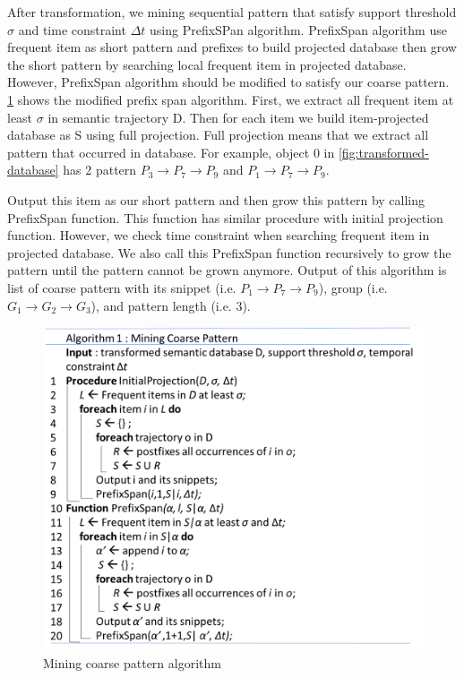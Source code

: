 \documentclass[conference]{IEEEtran}
\begin{document}
After transformation, we mining sequential pattern that satisfy support threshold $\sigma$ and time constraint $\Delta t$ using PrefixSPan algorithm. PrefixSpan algorithm use frequent item as short pattern and prefixes to build projected database then grow the short pattern by searching local frequent item in projected database. However, PrefixSpan algorithm should be modified to satisfy our coarse pattern. \ref{fig:mining-coarse-pattern} shows the modified prefix span algorithm. First, we extract all frequent item at least $\sigma$ in semantic trajectory D. Then for each item we build item-projected database as S using full projection. Full projection means that we extract all pattern that occurred in database. For example, object 0 in \ref{fig:transformed-database} has 2 pattern $P_{3}\rightarrow P_{7}\rightarrow P_{9}$ and $P_{1}\rightarrow P_{7}\rightarrow P_{9}$.
\par
Output this item as our short pattern and then grow this pattern by calling PrefixSpan function. This function has similar procedure with initial projection function. However, we check time constraint when searching frequent item in projected database. We also call this PrefixSpan function recursively to grow the pattern until the pattern cannot be grown anymore. Output of this algorithm is list of coarse pattern with its snippet (i.e. $P_{1}\rightarrow P_{7}\rightarrow P_{9}$), group (i.e. $G_{1}\rightarrow G_{2}\rightarrow G_{3}$), and pattern length (i.e. 3).  

\begin{figure}[!ht]
	\centering
	\includegraphics[width=1.0\linewidth]{mining_coarse_pattern}
	\caption{Mining coarse pattern algorithm}
	\label{fig:mining-coarse-pattern}
\end{figure}
\end{document}
